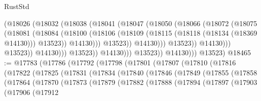 \begin{lexlean}{RustStd}
\begin{coremodule}
                                    (@18026
                                      (@18032
                                        (@18038
                                          (@18041
                                            (@18047
                                              (@18050
                                                (@18066
                                                  (@18072
                                                    (@18075
                                                      (@18081
                                                        (@18084
                                                          (@18100
                                                            (@18106
                                                              (@18109
                                                                (@18115
                                                                  (@18118 (@18134 (@18369 @14130)))
                                                                  @13523))
                                                              @14130)))
                                                        @13523))
                                                    @14130)))
                                              @13523))
                                          @14130)))
                                    @13523))
                                @14130)))
                          @13523))
                      @14130)))
                @13523))
            @14130)))
      @13523)
@18465 := @17783
    (@17786
      (@17792
        (@17798
          (@17801
            (@17807
              (@17810
                (@17816
                  (@17822
                    (@17825
                      (@17831
                        (@17834
                          (@17840
                            (@17846
                              (@17849
                                (@17855
                                  (@17858
                                    (@17864
                                      (@17870
                                        (@17873
                                          (@17879
                                            (@17882
                                              (@17888
                                                (@17894
                                                  (@17897
                                                    (@17903
                                                      (@17906
                                                        (@17912

\end{coremodule}
\end{lexlean}
